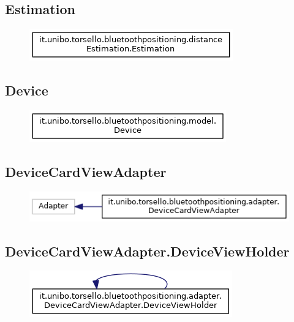 \newpage

\subsection{Estimation}
\begin{figure}[ph]
	\centering
	\includegraphics[scale=.55]{img/uml/inherit_graph/inherit_graph_8.png}
	\caption[]{}
\end{figure}

\subsection{Device}
\begin{figure}[ph]
	\centering
	\includegraphics[scale=.55]{img/uml/inherit_graph/inherit_graph_13.png}
	\caption[]{}
\end{figure}

\subsection{DeviceCardViewAdapter}
\begin{figure}[ph]
	\centering
	\includegraphics[scale=.55]{img/uml/inherit_graph/inherit_graph_1.png}
	\caption[]{}
\end{figure}

\newpage

\subsection{DeviceCardViewAdapter.DeviceViewHolder}
\begin{figure}[ph]
	\centering
	\includegraphics[scale=.55]{img/uml/inherit_graph/inherit_graph_2.png}
	\caption[]{}
\end{figure}

